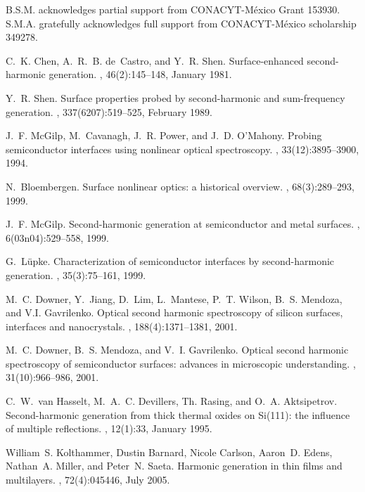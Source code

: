 \documentclass[aps,prb,10pt,showpacs,letterpaper,twocolumn]{revtex4-1}
\begin{document}
B.S.M. acknowledges partial support from CONACYT-M\'exico Grant 153930. S.M.A.
gratefully acknowledges full support from CONACYT-M\'exico scholarship 349278.


% 
\begin{thebibliography}{10}
%
C.~K. Chen, A.~R.~B. de~Castro, and Y.~R. Shen.
\newblock Surface-enhanced second-harmonic generation.
, 46(2):145--148, January 1981.

Y.~R. Shen.
\newblock Surface properties probed by second-harmonic and sum-frequency
  generation.
, 337(6207):519--525, February 1989.

J.~F. McGilp, M.~Cavanagh, J.~R. Power, and J.~D. O'Mahony.
\newblock Probing semiconductor interfaces using nonlinear optical
  spectroscopy.
, 33(12):3895--3900, 1994.

N.~Bloembergen.
\newblock Surface nonlinear optics: a historical overview.
, 68(3):289--293, 1999.

J.~F. McGilp.
\newblock Second-harmonic generation at semiconductor and metal surfaces.
, 6(03n04):529--558, 1999.

G.~L{\"u}pke.
\newblock Characterization of semiconductor interfaces by second-harmonic
  generation.
, 35(3):75--161, 1999.

M.~C. Downer, Y.~Jiang, D.~Lim, L.~Mantese, P.~T. Wilson, B.~S. Mendoza, and
  V.I. Gavrilenko.
\newblock Optical second harmonic spectroscopy of silicon surfaces, interfaces
  and nanocrystals.
, 188(4):1371--1381, 2001.

M.~C. Downer, B.~S. Mendoza, and V.~I. Gavrilenko.
\newblock Optical second harmonic spectroscopy of semiconductor surfaces:
  advances in microscopic understanding.
, 31(10):966--986, 2001.

C.~W.~van Hasselt, M.~A.~C. Devillers, Th. Rasing, and O.~A. Aktsipetrov.
\newblock Second-harmonic generation from thick thermal oxides on {Si}(111):
  the influence of multiple reflections.
, 12(1):33, January 1995.

William~S. Kolthammer, Dustin Barnard, Nicole Carlson, Aaron~D. Edens,
  Nathan~A. Miller, and Peter~N. Saeta.
\newblock Harmonic generation in thin films and multilayers.
, 72(4):045446, July 2005.


\end{thebibliography}
\end{document}
